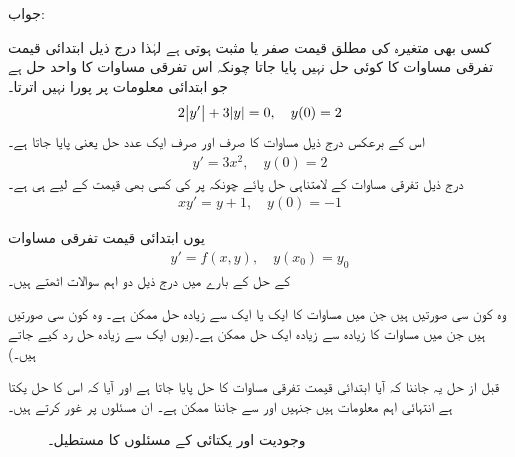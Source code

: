 جواب:

کسی بھی متغیرہ کی مطلق قیمت صفر یا مثبت  ہوتی ہے لہٰذا درج ذیل ابتدائی قیمت تفرقی مساوات کا کوئی حل نہیں پایا جاتا چونکہ اس تفرقی مساوات کا واحد حل  ہے جو ابتدائی معلومات پر پورا نہیں اترتا۔
\begin{align*}
2\abs{y'}+3\abs{y}=0, \quad y(0)=2
\end{align*}
اس کے برعکس درج ذیل مساوات کا صرف اور صرف ایک عدد حل یعنی  پایا جاتا ہے۔
\begin{align*}
y'=3x^2,\quad y(0)=2
\end{align*}
درج ذیل تفرقی مساوات کے  لامتناہی حل  پائے چونکہ  پر  کی کسی بھی قیمت کے لیے  ہی ہے۔
\begin{align*}
xy'=y+1,\quad y(0)=-1
\end{align*}  

یوں ابتدائی قیمت تفرقی مساوات 
\begin{align}\label{مساوات_سادہ_اول_وجودیت_حل_الف}
y'=f(x,y),\quad y(x_0)=y_0
\end{align}
کے حل کے بارے میں درج ذیل دو اہم سوالات اٹھتے ہیں۔ 

\begin{description}
 وہ کون سی صورتیں ہیں جن میں مساوات  کا ایک یا ایک سے زیادہ حل ممکن ہے۔
  وہ کون سی صورتیں ہیں جن میں مساوات   کا زیادہ سے زیادہ ایک حل ممکن ہے۔(یوں ایک سے زیادہ حل رد کیے جاتے ہیں۔)
\end{description}

قبل از حل یہ جاننا کہ آیا ابتدائی قیمت تفرقی مساوات کا حل پایا جاتا ہے اور آیا کہ اس کا حل یکتا ہے  انتہائی اہم معلومات ہیں جنہیں  اور  سے جاننا ممکن ہے۔ ان مسئلوں پر غور کرتے ہیں۔

\begin{figure}
\centering
{}
\caption{وجودیت اور یکتائی کے مسئلوں کا مستطیل۔}
\label{شکل_سادہ_اول_مستطیل}
\end{figure}

